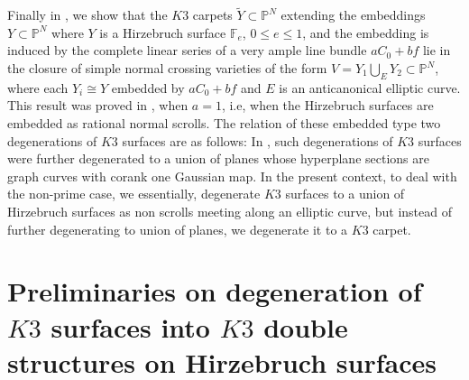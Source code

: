 \documentclass[11pt,twoside]{amsart}
\theoremstyle{plain}
\numberwithin{equation}{section}
\theoremstyle{definition}
\newtheorem{definition}[theorem]{Definition}
\begin{document}
Finally in , we show that the $K3$ carpets $\widetilde{Y} \subset \mathbb{P}^N$ extending the embeddings $Y \subset \mathbb{P}^N$ where $Y$ is a Hirzebruch surface $\mathbb{F}_e$, $0 \leq e \leq 1$, and the embedding is induced by the complete linear series of a very ample line bundle $aC_0+bf$ lie in the closure of simple normal crossing varieties of the form $V = Y_1 \bigcup_E Y_2 \subset \mathbb{P}^N$, where each $Y_i \cong Y$ embedded by $aC_0+bf$ and $E$ is an anticanonical elliptic curve. This result was proved in \cite{CLM93}, when $a = 1$, i.e, when the Hirzebruch surfaces are embedded as rational normal scrolls. The relation of these embedded type two degenerations of $K3$ surfaces are as follows: In \cite{CLM93}, such degenerations of $K3$ surfaces were further degenerated to a union of planes whose hyperplane sections are graph curves with corank one Gaussian map. In the present context, to deal with the non-prime case, we essentially, degenerate $K3$ surfaces to a union of Hirzebruch surfaces as non scrolls meeting along an elliptic curve, but instead of further degenerating to union of planes, we degenerate it to a $K3$ carpet.












\section{Preliminaries on degeneration of $K3$ surfaces into $K3$ double structures on Hirzebruch surfaces}
\end{document}
